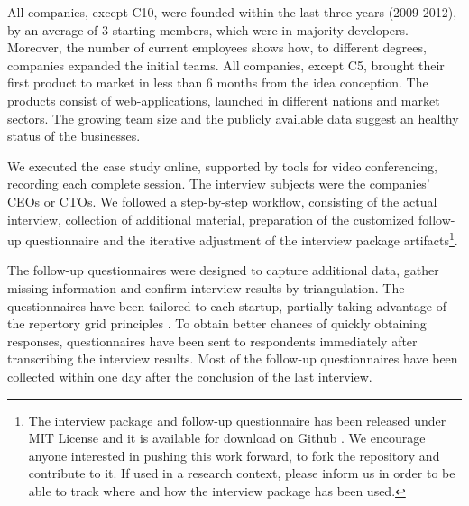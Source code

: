 \documentclass[10pt,journal,letterpaper,compsoc]{IEEEtran}
\begin{document}
All companies, except C10, were founded within the last three years (2009-2012), 
by an average of 3 starting members, which were in majority developers. 
Moreover, the number of current employees shows how, to different degrees, 
companies expanded the initial teams. All companies, except C5, brought their 
first product to market in less than 6 months from the idea conception. The 
products consist of web-applications, launched in different nations and market 
sectors. The growing team size and the publicly available data suggest an 
healthy status of the businesses.

We executed the case study online, supported by tools for video conferencing, 
recording each complete session. The interview subjects were the companies' CEOs 
or CTOs. We followed a step-by-step workflow, consisting of the actual 
interview, collection of additional material, preparation of the customized 
follow-up questionnaire and the iterative adjustment of the interview package 
artifacts\footnote{The interview package and follow-up questionnaire has been 
released under MIT License \cite{MITLicense} and it is available for download on 
Github \cite{GitHubInterviewPackage}. We encourage anyone interested in pushing 
this work forward, to fork the repository and contribute to it. If used in a 
research context, please inform us in order to be able to track where and how 
the interview package has been used.}.

The follow-up questionnaires were designed to capture additional data, gather 
missing information and confirm interview results by triangulation. The 
questionnaires have been tailored to each startup, partially taking advantage of 
the repertory grid principles \cite{Edwards2009}. To obtain better chances of 
quickly obtaining responses, questionnaires have been sent to respondents 
immediately after transcribing the interview results. Most of the follow-up questionnaires have been collected within one day after the 
conclusion of the last interview.   %

\end{document}
